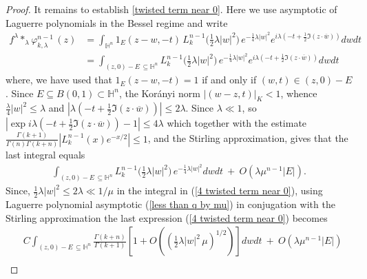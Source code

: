 \documentclass[10pt,a4paper]{amsart}
\def\Ha{\mathbb{H}^n}
\begin{document}
\begin{proof}
It remains to establish \eqref{twisted term near 0}. Here we use asymptotic of Laguerre polynomials in the Bessel regime and write  
    \begin{equation*}\label{3 twisted term near 0}
    \begin{split}
        f^{\lambda} \ast_{\lambda} \varphi_{k, \lambda}^{n-1} \, (z) &  = \int_{\mathbb H^n} 1_{E}(z-w,-t) \, L_k^{n-1}\big( {\textstyle \frac{1}{2}} \lambda|w|^2 \big) \, e^{- \frac{1}{4}\lambda |w|^2}   e^{i \lambda \left(-t+\frac12 \Im(z\cdot \overline{w}) \right)}dwdt \\
        & = \int_{(z,0) - E \,  \subseteq \mathbb H^n}  L_k^{n-1}\big( {\textstyle \frac{1}{2}} \lambda|w|^2 \big) \, e^{- \frac{1}{4}\lambda |w|^2}   e^{i \lambda \left(-t+\frac12 \Im(z\cdot \overline{w}) \right)}dwdt
    \end{split}
\end{equation*}
where,  we have used that  $1_{E}(z-w, -t)=1$ if and only if $(w,t) \in (z,0) - E$. Since $E \subseteq B(0,1) \subset \Ha$, the Kor\'anyi norm $|(w-z,t)|_{K} <1$, whence  $\frac{\lambda}{4} |w |^2 \leq \lambda$ and $| \lambda \left(-t+\frac12 \Im(z\cdot \overline{w}) \right) | \leq 2\lambda$. Since $\lambda \ll  1$, so $ \left| \exp{ i \lambda \left(-t+\frac12 \Im(z\cdot \overline{w}) \right) } - 1 \right| \leq 4 \lambda$ which together with the estimate $\frac{\Gamma(k+1)}{\Gamma(n)\Gamma(k+n)} |L_{k}^{n-1}(x) e^{-x/2}| \leq 1$,  and the Stirling approximation, gives that the last integral equals
\begin{equation}\label{4 twisted term near 0}
    \begin{split}
         \int_{(z,0) - E \,  \subseteq \mathbb H^n}  L_k^{n-1}\big( {\textstyle \frac{1}{2}} \lambda|w|^2 \big) \, e^{- \frac{1}{4}\lambda |w|^2}  dwdt \ + \ O \left( \lambda \mu^{n-1} |E| \right).
    \end{split}
\end{equation}
Since, ${\textstyle\frac{1}{2}} \lambda |w|^2 \leq 2 \lambda \ll 1/ \mu$  in the integral in (\ref{4 twisted term near 0}), using Laguerre polynomial asymptotic (\ref{less than q by mu}) in conjugation with the Stirling approximation the last expression (\ref{4 twisted term near 0})  becomes
\begin{equation*}\label{5 twisted term near 0}
    \begin{split}
        & C  \int_{(z,0) - E \,  \subseteq \mathbb H^n} \frac{\Gamma(k+n)}{\Gamma(k+1)} \left[ 1 + O  \left( \left( {\textstyle\frac{1}{2}} \lambda |w|^2 \, \mu \right)^{1/2} \right) \right]  dwdt \ + \ O \left( \lambda \mu^{n-1} |E| \right)\\

\end{split}
\end{equation*}
\end{proof}
\end{document}
